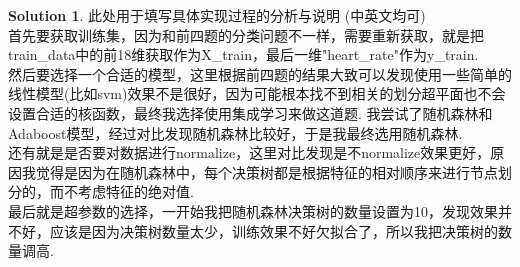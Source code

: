 \documentclass[a4paper,UTF8]{article}
\numberwithin{equation}{section}
\numberwithin{equation}{section}
\theoremstyle{definition}
\newtheorem*{solution}{Solution}
\begin{document}
\begin{solution}
	此处用于填写具体实现过程的分析与说明 (中英文均可) \\
    首先要获取训练集，因为和前四题的分类问题不一样，需要重新获取，就是把train\_data中的前18维获取作为X\_train，最后一维"heart\_rate"作为y\_train.\\
    然后要选择一个合适的模型，这里根据前四题的结果大致可以发现使用一些简单的线性模型(比如svm)效果不是很好，因为可能根本找不到相关的划分超平面也不会设置合适的核函数，最终我选择使用集成学习来做这道题. 我尝试了随机森林和Adaboost模型，经过对比发现随机森林比较好，于是我最终选用随机森林. \\
    还有就是是否要对数据进行normalize，这里对比发现是不normalize效果更好，原因我觉得是因为在随机森林中，每个决策树都是根据特征的相对顺序来进行节点划分的，而不考虑特征的绝对值. \\
    最后就是超参数的选择，一开始我把随机森林决策树的数量设置为10，发现效果并不好，应该是因为决策树数量太少，训练效果不好欠拟合了，所以我把决策树的数量调高. \\
\end{solution}
\end{document}
